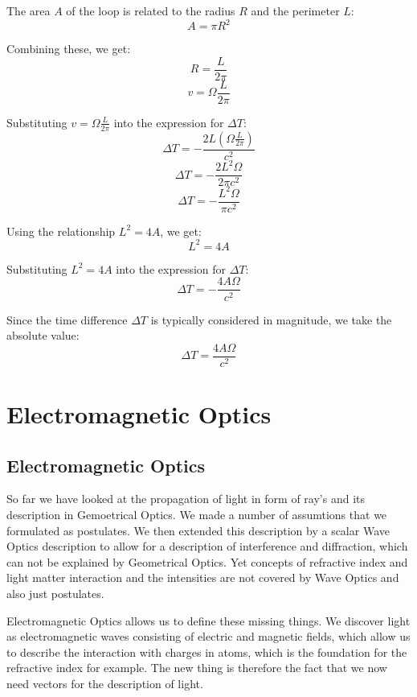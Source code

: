 \documentclass[
  a4paper,
]{book}
\begin{document}
\begin{tcolorbox}
The area \(A\) of the loop is related to the radius \(R\) and the
perimeter \(L\): \[
A = \pi R^2
\]

Combining these, we get: \[
R = \frac{L}{2\pi}
\] \[
v = \Omega \frac{L}{2\pi}
\]

Substituting \(v = \Omega \frac{L}{2\pi}\) into the expression for
\(\Delta T\): \[
\Delta T = -\frac{2L \left(\Omega \frac{L}{2\pi}\right)}{c^2}
\] \[
\Delta T = -\frac{2L^2 \Omega}{2\pi c^2}
\] \[
\Delta T = -\frac{L^2 \Omega}{\pi c^2}
\]

Using the relationship \(L^2 = 4A\), we get: \[
L^2 = 4A
\]

Substituting \(L^2 = 4A\) into the expression for \(\Delta T\): \[
\Delta T = -\frac{4A \Omega}{c^2}
\]

Since the time difference \(\Delta T\) is typically considered in
magnitude, we take the absolute value: \[
\Delta T = \frac{4 A \Omega}{c^2}
\]

\end{tcolorbox}

\part{Electromagnetic Optics}

\chapter{Electromagnetic Optics}\label{electromagnetic-optics-1}

So far we have looked at the propagation of light in form of ray's and
its description in Gemoetrical Optics. We made a number of assumtions
that we formulated as postulates. We then extended this description by a
scalar Wave Optics description to allow for a description of
interference and diffraction, which can not be explained by Geometrical
Optics. Yet concepts of refractive index and light matter interaction
and the intensities are not covered by Wave Optics and also just
postulates.

Electromagnetic Optics allows us to define these missing things. We
discover light as electromagnetic waves consisting of electric and
magnetic fields, which allow us to describe the interaction with charges
in atoms, which is the foundation for the refractive index for example.
The new thing is therefore the fact that we now need vectors for the
description of light.
\end{document}
